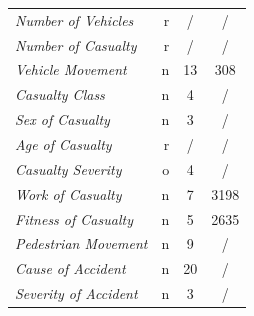 \documentclass{article}
\begin{document}
\begin{table}[H]
{\begin{tabular}{l@{}r@{}c@{}c}
            \textit{Number of Vehicles} & r & / &/\\
            \textit{Number of Casualty} & r & / &/\\
            \textit{Vehicle Movement} & n & 13 & 308\\
            \textit{Casualty Class} & n & 4 &/ \\
            \textit{Sex of Casualty} & n & 3 & / \\
            \textit{Age of Casualty} & r & / & /\\
            \textit{Casualty Severity} & o & 4 & / \\
            \textit{Work of Casualty} & n & 7 & 3198\\
            \textit{Fitness of Casualty} & n & 5 & 2635 \\
            \textit{Pedestrian Movement} & n & 9 &/ \\
            \textit{Cause of Accident} & n & 20 & /\\
            \textit{Severity of Accident} & n & 3 & /
        \end{tabular}}
\end{table}
\end{document}
